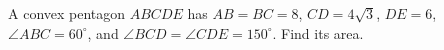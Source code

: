 A convex pentagon $ABCDE$ has $AB=BC=8$, $CD=4\sqrt3$, $DE=6$, $\angle ABC=60^\circ$, and $\angle BCD=\angle CDE=150^\circ$. Find its area.
